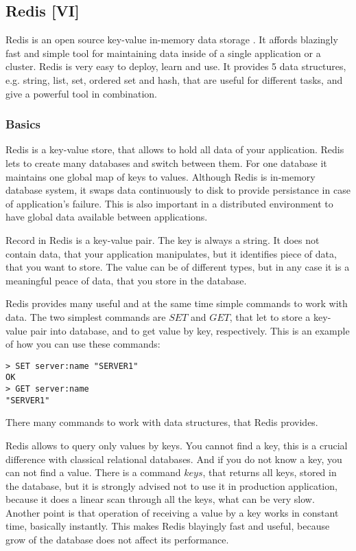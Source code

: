 \subsection{Redis [VI]}

Redis is an open source key-value in-memory data storage \cite{Seguin2012} \cite{Redis}.
It affords blazingly fast and simple tool for maintaining data inside of a single application or a cluster.
Redis is very easy to deploy, learn and use.
It provides 5 data structures, e.g. string, list, set, ordered set and hash, that are useful for different tasks, and give a powerful tool in combination.

\subsubsection{Basics}

Redis is a key-value store, that allows to hold all data of your application.
Redis lets to create many databases and switch between them.
For one database it maintains one global map of keys to values.
Although Redis is in-memory database system, it swaps data continuously to disk to provide persistance in case of application's failure.
This is also important in a distributed environment to have global data available between applications.

Record in Redis is a key-value pair.
The key is always a string.
It does not contain data, that your application manipulates, but it identifies piece of data, that you want to store.
The value can be of different types, but in any case it is a meaningful peace of data, that you store in the database.

Redis provides many useful and at the same time simple commands to work with data.
The two simplest commands are $SET$ and $GET$, that let to store a key-value pair into database, and to get value by key, respectively.
This is an example of how you can use these commands:
\begin{verbatim}
> SET server:name "SERVER1"
OK
> GET server:name
"SERVER1"
\end{verbatim}
There many commands to work with data structures, that Redis provides.

Redis allows to query only values by keys.
You cannot find a key, this is a crucial difference with classical relational databases.
And if you do not know a key, you can not find a value.
There is a command $keys$, that returns all keys, stored in the database, but it is strongly advised not to use it in production application, because it does a linear scan through all the keys, what can be very slow.
Another point is that operation of receiving a value by a key works in constant time, basically instantly.
This makes Redis blayingly fast and useful, because grow of the database does not affect its performance.

